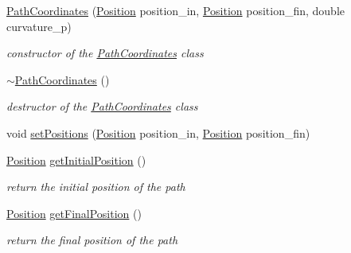 \begin{DoxyCompactItemize}
\item 
\mbox{\hyperlink{class_path2_d_1_1_element_1_1_path_coordinates_a63f9e5d25a023ed5aa42d440ef095afa}{Path\+Coordinates}} (\mbox{\hyperlink{class_path2_d_1_1_element_1_1_position}{Position}} position\+\_\+in, \mbox{\hyperlink{class_path2_d_1_1_element_1_1_position}{Position}} position\+\_\+fin, double curvature\+\_\+p)
\begin{DoxyCompactList}\small\item\em constructor of the \mbox{\hyperlink{class_path2_d_1_1_element_1_1_path_coordinates}{Path\+Coordinates}} class \end{DoxyCompactList}\item 
\mbox{\label{class_path2_d_1_1_element_1_1_path_coordinates_a67ac69efd20e7567548bf95df80095ab}} 
\mbox{\hyperlink{class_path2_d_1_1_element_1_1_path_coordinates_a67ac69efd20e7567548bf95df80095ab}{$\sim$\+Path\+Coordinates}} ()
\begin{DoxyCompactList}\small\item\em destructor of the \mbox{\hyperlink{class_path2_d_1_1_element_1_1_path_coordinates}{Path\+Coordinates}} class \end{DoxyCompactList}\item 
void \mbox{\hyperlink{class_path2_d_1_1_element_1_1_path_coordinates_aa186070d9a737ae97904fdadfb72aad7}{set\+Positions}} (\mbox{\hyperlink{class_path2_d_1_1_element_1_1_position}{Position}} position\+\_\+in, \mbox{\hyperlink{class_path2_d_1_1_element_1_1_position}{Position}} position\+\_\+fin)
\item 
\mbox{\hyperlink{class_path2_d_1_1_element_1_1_position}{Position}} \mbox{\hyperlink{class_path2_d_1_1_element_1_1_path_coordinates_aed77d05b5c06d46d95f92a2869006e13}{get\+Initial\+Position}} ()
\begin{DoxyCompactList}\small\item\em return the initial position of the path \end{DoxyCompactList}\item 
\mbox{\hyperlink{class_path2_d_1_1_element_1_1_position}{Position}} \mbox{\hyperlink{class_path2_d_1_1_element_1_1_path_coordinates_a169ed599c2de6960c5fe74ea559ea798}{get\+Final\+Position}} ()
\begin{DoxyCompactList}\small\item\em return the final position of the path \end{DoxyCompactList}\item 

\end{DoxyCompactItemize}
